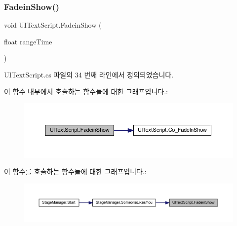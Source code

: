 \subsubsection{\texorpdfstring{FadeinShow()}{FadeinShow()}}
{\footnotesize\ttfamily void U\+I\+Text\+Script.\+Fadein\+Show (\begin{DoxyParamCaption}\item[{float}]{range\+Time }\end{DoxyParamCaption})}



U\+I\+Text\+Script.\+cs 파일의 34 번째 라인에서 정의되었습니다.


\begin{DoxyCode}{0}

\end{DoxyCode}
이 함수 내부에서 호출하는 함수들에 대한 그래프입니다.\+:\nopagebreak
\begin{figure}[H]
\begin{center}
\leavevmode
\includegraphics[width=350pt]{da/d8d/class_u_i_text_script_a0843c4fe533a5d83147b106a496c84ef_cgraph}
\end{center}
\end{figure}
이 함수를 호출하는 함수들에 대한 그래프입니다.\+:\nopagebreak
\begin{figure}[H]
\begin{center}
\leavevmode
\includegraphics[width=350pt]{da/d8d/class_u_i_text_script_a0843c4fe533a5d83147b106a496c84ef_icgraph}
\end{center}
\end{figure}
\mbox{\label{class_u_i_text_script_adfa2885d1c5654ce0a8da9fe0c5c15f8}} 
